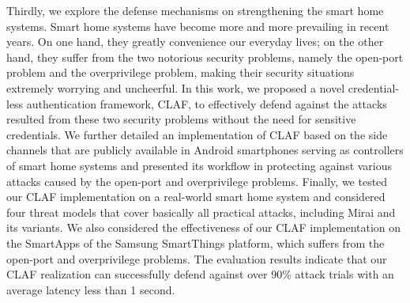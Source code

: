 \documentclass[letterpaper,12pt]{article}
\begin{document}
    Thirdly, we explore the defense mechanisms on strengthening the smart home systems. Smart home systems have become more and more prevailing in recent years. On one hand, they greatly convenience our everyday lives; on the other hand, they suffer from the two notorious security problems, namely the open-port problem and the overprivilege problem, making their security situations extremely worrying and uncheerful. In this work, we proposed a novel credential-less authentication framework, CLAF, to effectively defend against the attacks resulted from these two security problems without the need for sensitive credentials. We further detailed an implementation of CLAF based on the side channels that are publicly available in Android smartphones serving as controllers of smart home systems and presented its workflow in protecting against various attacks caused by the open-port and overprivilege problems. Finally, we tested our CLAF implementation on a real-world smart home system and considered four threat models that cover basically all practical attacks, including Mirai and its variants. We also considered the effectiveness of our CLAF implementation on the SmartApps of the Samsung SmartThings platform, which suffers from the open-port and overprivilege problems. The evaluation results indicate that our CLAF realization can successfully defend against over 90\% attack trials with an average latency less than 1 second.
    
   
      \newpage

   \tableofcontents
   \restoregeometry
   \newpage


   \cleardoublepage
    \label{listoffig}
   \begin{center}
       \listoffigures
   \end{center}
   \newpage
   
   \cleardoublepage
    \label{listoftbl}
   \begin{center}
       \listoftables
   \end{center}
   \newpage
\end{document}
